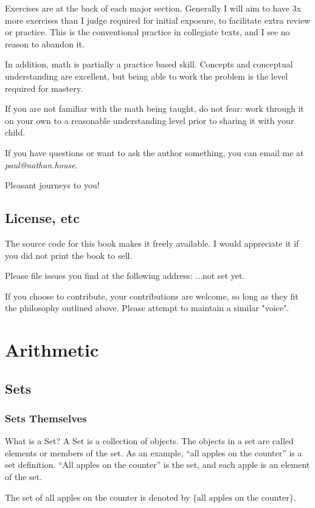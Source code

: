 Exercises are at the back of each major section. Generally I will aim to have 3x more exercises than I judge required for initial exposure, to facilitate extra review or practice. This is the conventional practice in collegiate texts, and I see no reason to abandon it. 

In addition, math is partially a practice based skill. Concepts and conceptual understanding are excellent, but being able to work the problem is the level required for mastery. 

If you are not familiar with the math being taught, do not fear: work through it on your own to a reasonable understanding level prior to sharing it with your child. 


If you have questions or want to ask the author something, you can email me at \textit{paul@nathan.house}.

Pleasant journeys to you!

\section{License, etc}

The source code for this book makes it freely available.  I would appreciate it if you did not print the book to sell. 

Please file issues you find at the following address: ...not set yet.

If you choose to contribute, your contributions are welcome, so long as they fit the philosophy outlined above. Please attempt to maintain a similar "voice".

\chapter{Arithmetic}

\section{Sets}
\subsection{Sets Themselves}
What is a Set?
A Set is a collection of objects.
The objects in a set are called elements or members of the set.
As an example, ``all apples on the counter'' is a set definition.
``All apples on the counter'' is the set, and each apple is an element of the set.

The set of all apples on the counter is denoted by $\{ \text{all apples on the counter} \}$.

